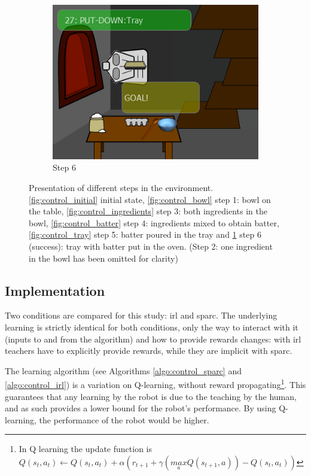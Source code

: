 \begin{figure}[ht]
\begin{subfigure}[b]{0.3\textwidth}
		\includegraphics[width=\textwidth]{step6.png}
		\caption{Step 6}
		\label{fig:control_goal}
	\end{subfigure}
	
	\caption{Presentation of different steps in the environment. \ref{fig:control_initial} initial state, \ref{fig:control_bowl} step 1: bowl on the table, \ref{fig:control_ingredients} step 3: both ingredients in the bowl, \ref{fig:control_batter} step 4: ingredients mixed to obtain batter, \ref{fig:control_tray} step 5: batter poured in the tray and \ref{fig:control_goal} step 6 (success): tray with batter put in the oven. (Step 2: one ingredient in the bowl has been omitted for clarity)}
	\label{fig:control_states}
\end{figure}

\subsection{Implementation}

Two conditions are compared for this study: \gls{irl} and \gls{sparc}. The underlying learning is strictly identical for both conditions, only the way to interact with it (inputs to and from the algorithm) and how to provide rewards changes: with \gls{irl} teachers have to explicitly provide rewards, while they are implicit with \gls{sparc}. 

The learning algorithm (see Algorithms \ref{algo:control_sparc} and \ref{algo:control_irl}) is a variation on Q-learning, without reward propagating\footnote{In Q learning the update function is $Q(s_{t},a_{t}) \leftarrow Q(s_{t},a_{t}) + \alpha (r_{t+1}+\gamma (\underset{a}{max} Q(s_{t+1},a))-Q(s_{t},a_{t}))$}. This guarantees that any learning by the robot is due to the teaching by the human, and as such provides a lower bound for the robot's performance. By using Q-learning, the performance of the robot would be higher.

